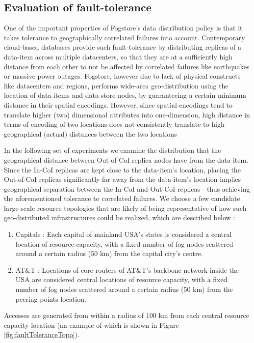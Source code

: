 \subsection{Evaluation of fault-tolerance}
One of the important properties of Fogstore's data distribution policy is that it takes tolerance to geographically correlated failures into account. Contemporary cloud-based databases provide such fault-tolerance by distributing replicas of a data-item across multiple datacenters, so that they are at a sufficiently high distance from each other to not be affected by correlated failures like earthquakes or massive power outages. Fogstore, however due to lack of physical constructs like datacenters and regions, performs wide-area geo-distribution using the location of data-items and data-store nodes, by guaranteeing a certain minimum distance in their spatial encodings. However, since spatial encodings tend to translate higher (two) dimensional attributes into one-dimension, high distance in terms of encoding of two locations does not consistently translate to high geographical (actual) distances between the two locations 
\par In the following set of experiments we examine the distribution that the geographical distance between Out-of-CoI replica nodes have from the data-item. Since the In-CoI replicas are kept close to the data-item's location, placing the Out-of-CoI replicas significantly far away from the data-item's location implies geographical separation between the In-CoI and Out-CoI replicas - thus achieving the aforementioned tolerance to correlated failures. We choose a few candidate large-scale resource topologies that are likely of being representative of how such geo-distributed infrastructures could be realized, which are described below :
\begin{enumerate}
\item Capitals : Each capital of mainland USA's states is considered a central location of resource capacity, with a fixed number of fog nodes scattered around a certain radius (50 km) from the capital city's centre.
\item AT\&T : Locations of core routers of AT\&T's backbone network inside the USA are considered central locations of resource capacity, with a fixed number of fog nodes scattered around a certain radius (50 km) from the peering points location.
\end{enumerate}
\par Accesses are generated from within a radius of 100 km from each central resource capacity location (an example of which is shown in Figure \ref{fig:faultToleranceTopo}).
